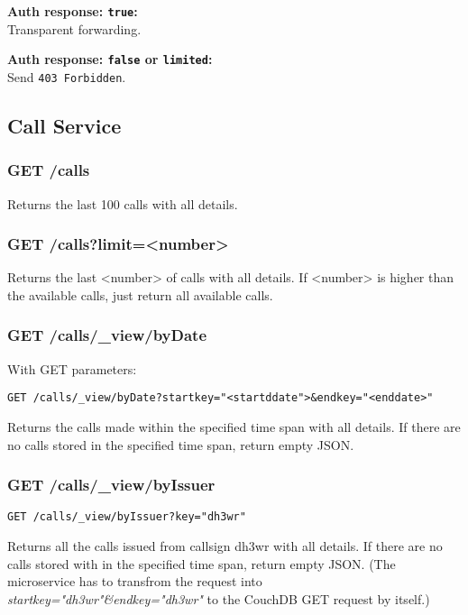 \textbf{Auth response: \texttt{true}:}\\
Transparent forwarding.

\textbf{Auth response: \texttt{false} or \texttt{limited}:}\\
Send \verb|403 Forbidden|.


\newpage
\subsection{Call Service}

\subsubsection{GET /calls}
Returns the last 100 calls with all details.

\subsubsection{GET /calls?limit=<number>}

Returns the last <number> of calls with all details. If <number> is higher than the available calls, just return all available calls.

\subsubsection{GET /calls/\_view/byDate}
With GET parameters:

\begin{verbatim}
GET /calls/_view/byDate?startkey="<startddate">&endkey="<enddate>"
\end{verbatim}

Returns the calls made within the specified time span with all details. If there are no calls stored in the specified time span, return empty JSON.

\subsubsection{GET /calls/\_view/byIssuer}
\begin{verbatim}
GET /calls/_view/byIssuer?key="dh3wr"
\end{verbatim}

Returns all the calls issued from callsign dh3wr with all details. If there are no calls stored with in the specified time span, return empty JSON. (The microservice has to transfrom the request into \textit{startkey="dh3wr"\&endkey="dh3wr"} to the CouchDB GET request by itself.)

